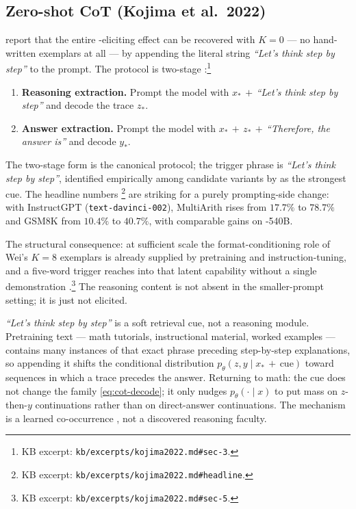 \subsection{Zero-shot CoT (Kojima et al.\ 2022)}
\label{sec:cot-zeroshot}

\citet{kojima2022} report that the entire -eliciting effect can be
recovered with $K = 0$ — no hand-written exemplars at all — by
appending the literal string \emph{``Let's think step by step''} to the
prompt. The protocol is two-stage
\citep[\S 3]{kojima2022}:\footnote{KB excerpt:
\texttt{kb/excerpts/kojima2022.md\#sec-3}.}
\begin{enumerate}
\item \textbf{Reasoning extraction.} Prompt the model with
$x_* \,+\,$\emph{``Let's think step by step''} and decode the trace
$z_*$.
\item \textbf{Answer extraction.} Prompt the model with
$x_* \,+\, z_* \,+\,$\emph{``Therefore, the answer is''} and decode
$y_*$.
\end{enumerate}
The two-stage form is the canonical protocol; the trigger phrase is
\emph{``Let's think step by step''}, identified empirically among
candidate variants by \citet{kojima2022} as the strongest cue. The
headline numbers \citep[headline]{kojima2022}\footnote{KB excerpt:
\texttt{kb/excerpts/kojima2022.md\#headline}.} are striking for a
purely prompting-side change: with InstructGPT (\texttt{text-davinci-002}),
MultiArith rises from $17.7\%$ to $78.7\%$ and GSM8K from $10.4\%$ to
$40.7\%$, with comparable gains on -540B.

The structural consequence: at sufficient scale the format-conditioning
role of Wei's $K = 8$ exemplars is already supplied by pretraining and
instruction-tuning, and a five-word trigger reaches into that latent
capability without a single demonstration
\citep[\S 5]{kojima2022}.\footnote{KB excerpt:
\texttt{kb/excerpts/kojima2022.md\#sec-5}.} The reasoning content is
not absent in the smaller-prompt setting; it is just not elicited.

\begin{intuition}
\emph{``Let's think step by step''} is a soft retrieval cue, not a
reasoning module. Pretraining text — math tutorials, instructional
material, worked examples — contains many instances of that exact
phrase preceding step-by-step explanations, so appending it shifts
the conditional distribution $p_\theta(z, y \mid x_* \,+\, \text{cue})$
toward sequences in which a trace precedes the answer. Returning to
math: the cue does not change the family
\cref{eq:cot-decode}; it only nudges $p_\theta(\cdot \mid x)$ to put
mass on $z$-then-$y$ continuations rather than on direct-answer
continuations. The mechanism is a learned co-occurrence
\citep[\S 5]{kojima2022}, not a discovered reasoning faculty.
\end{intuition}

